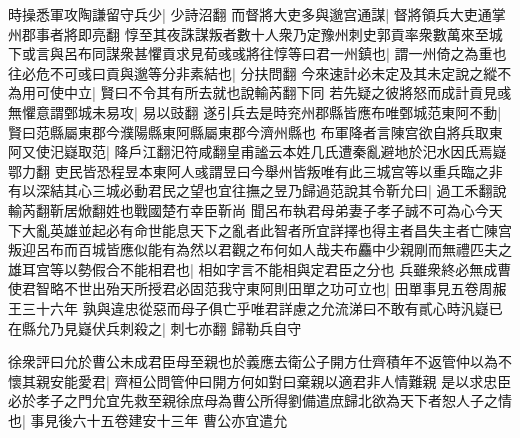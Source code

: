 時操悉軍攻陶謙留守兵少|{
	少詩沼翻}
而督將大吏多與邈宫通謀|{
	督將領兵大吏通掌州郡事者將即亮翻}
惇至其夜誅謀叛者數十人衆乃定豫州刺史郭貢率衆數萬來至城下或言與呂布同謀衆甚懼貢求見荀彧彧將往惇等曰君一州鎮也|{
	謂一州倚之為重也}
往必危不可彧曰貢與邈等分非素結也|{
	分扶問翻}
今來速計必未定及其未定說之縱不為用可使中立|{
	賢曰不令其有所去就也說輸芮翻下同}
若先疑之彼將怒而成計貢見彧無懼意謂鄄城未易攻|{
	易以豉翻}
遂引兵去是時兖州郡縣皆應布唯鄄城范東阿不動|{
	賢曰范縣屬東郡今濮陽縣東阿縣屬東郡今濟州縣也}
布軍降者言陳宫欲自將兵取東阿又使汜嶷取范|{
	降戶江翻汜符咸翻皇甫謐云本姓几氏遭秦亂避地於汜水因氏焉嶷鄂力翻}
吏民皆恐程昱本東阿人彧謂昱曰今舉州皆叛唯有此三城宫等以重兵臨之非有以深結其心三城必動君民之望也宜往撫之昱乃歸過范說其令靳允曰|{
	過工禾翻說輸芮翻靳居焮翻姓也戰國楚冇幸臣靳尚}
聞呂布執君母弟妻子孝子誠不可為心今天下大亂英雄並起必有命世能息天下之亂者此智者所宜詳擇也得主者昌失主者亡陳宫叛迎呂布而百城皆應似能有為然以君觀之布何如人哉夫布麤中少親剛而無禮匹夫之雄耳宫等以勢假合不能相君也|{
	相如字言不能相與定君臣之分也}
兵雖衆終必無成曹使君智略不世出殆天所授君必固范我守東阿則田單之功可立也|{
	田單事見五卷周赧王三十六年}
孰與違忠從惡而母子俱亡乎唯君詳慮之允流涕曰不敢有貳心時汎嶷已在縣允乃見嶷伏兵刺殺之|{
	刺七亦翻}
歸勒兵自守

徐衆評曰允於曹公未成君臣母至親也於義應去衛公子開方仕齊積年不返管仲以為不懷其親安能愛君|{
	齊桓公問管仲曰開方何如對曰棄親以適君非人情難親}
是以求忠臣必於孝子之門允宜先救至親徐庶母為曹公所得劉備遣庶歸北欲為天下者恕人子之情也|{
	事見後六十五卷建安十三年}
曹公亦宜遣允

